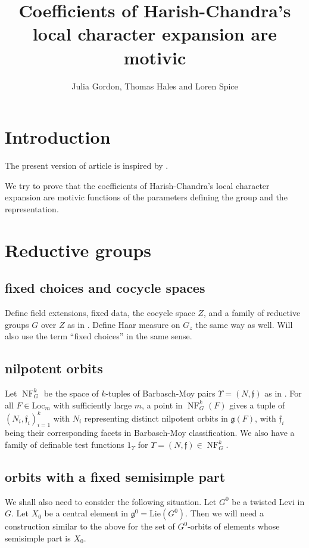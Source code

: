 \documentclass[12pt]{amsart}
\title{Coefficients of Harish-Chandra's local character expansion are motivic}
\author{Julia Gordon, Thomas Hales and Loren Spice}
\newcommand{\fg}{\mathfrak{g}}
\newcommand{\ff}{\mathfrak{f}}
\newcommand{\Loc}{\mathrm{Loc}}
\def\Lie{\mathrm{Lie}}
\newcommand{\op}[1]{\operatorname{#1}}
\newcommand{\NF}{\op{NF}}
\theoremstyle{plain}
\theoremstyle{definition}
\begin{document}

\maketitle

\section{Introduction}
The present version of article is inspired by \cite{unsuccessful self-treatment of writer's block}. 
 
We try to prove that the coefficients of Harish-Chandra's local character expansion are motivic functions of the parameters defining the group and the representation. 

\section{Reductive groups}
\subsection{fixed choices and cocycle spaces}
Define field extensions, fixed data, the cocycle space $Z$, and a family of reductive groups $G$ over $Z$ as in \cite{transfer transfer}. Define Haar measure on $G_z$ the same way as well.
Will also use the term ``fixed choices'' in the same sense. 

\subsection{nilpotent orbits} Let $\NF_G^k$ be the space of 
$k$-tuples of Barbasch-Moy pairs $\Upsilon=(N, \ff)$ as in  \cite{transfertransfer}. 
For all $F\in \Loc_m$ with sufficiently large $m$, 
a point in $\NF_G^k(F)$ gives a tuple of $(N_i, \ff_i)_{i=1}^k$ with $N_i$ representing distinct nilpotent orbits in $\fg(F)$, with $\ff_i$ being their corresponding facets in Barbasch-Moy classification. We also have a family of definable test functions $1_{\Upsilon}$ for 
$\Upsilon=(N, \ff)\in \NF_G^k$. 

\subsection{orbits with a fixed semisimple part} 
We shall also need to consider the following situation. 
Let $G^0$ be a twisted Levi in $G$. 
Let $X_0$ be a central element in $\fg^0=\Lie(G^0)$. 
Then we will need a construction similar to the above for the set of $G^0$-orbits of elements whose semisimple part is $X_0$. 
\end{document}
